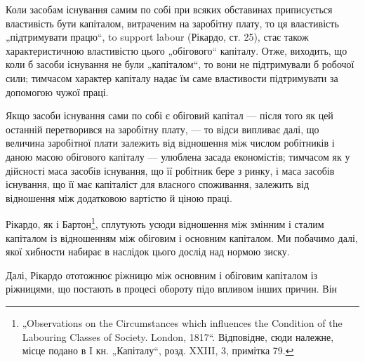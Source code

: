 Коли засобам існування самим по собі при всяких обставинах приписується
властивість бути капіталом, витраченим на заробітну плату, то
ця властивість „підтримувати працю“, to support labour (Рікардо, ст. 25),
стає також характеристичною властивістю цього „обігового“ капіталу.
Отже, виходить, що коли б засоби існування не були „капіталом“, то
вони не підтримували б робочої сили; тимчасом характер капіталу надає
їм саме властивости підтримувати  за допомогою чужої праці.

Якщо засоби існування сами по собі є обіговий капітал — після того
як цей останній перетворився на заробітну плату, — то відси випливає
далі, що величина заробітної плати залежить від відношення між числом
робітників і даною масою обігового капіталу — улюблена засада економістів;
тимчасом як у дійсності маса засобів існування, що її робітник
бере з ринку, і маса засобів існування, що її має капіталіст для власного
споживання, залежить від відношення між додатковою вартістю й ціною
праці.

Рікардо, як і Бартон\footnote{
„Observations on the Circumstances which influences the Condition of the
Labouring Classes of Society. London, 1817“. Відповідне, сюди належне, місце
подано в I кн. „Капіталу“, розд. XXIII, 3, примітка 79.
}, сплутують усюди відношення між змінним і сталим
капіталом із відношенням між обіговим і основним капіталом. Ми побачимо
далі, якої хибности набирає в наслідок цього дослід над нормою зиску.

Далі, Рікардо ототожнює ріжницю між основним і обіговим капіталом із
ріжницями, що постають в процесі обороту підо впливом інших причин. Він
\parbreak{}  %
